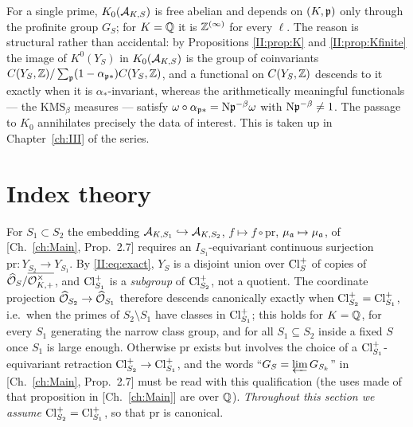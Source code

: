 \begin{remark}\label{II:rem:noarith}
For a single prime, $K_0(\mathcal{A}_{K,S})$ is free abelian and depends on $(K,\mathfrak{p})$ only through
the profinite group $G_S$; for $K=\mathbb{Q}$ it is $\mathbb{Z}^{(\infty)}$ for every $\ell$. The reason
is structural rather than accidental: by Propositions \ref{II:prop:K} and \ref{II:prop:Kfinite}
the image of $K^0(Y_S)$ in $K_0(\mathcal{A}_{K,S})$ is the group of coinvariants
$C(Y_S,\mathbb{Z})/\sum_{\mathfrak{p}}(1-\alpha_{\mathfrak{p}*})C(Y_S,\mathbb{Z})$, and a functional on $C(Y_S,\mathbb{Z})$ descends
to it exactly when it is $\alpha_*$-invariant, whereas the arithmetically meaningful
functionals --- the $\mathrm{KMS}_\beta$ measures --- satisfy
$\omega\circ\alpha_{\mathfrak{p}*}=\mathrm{N}\mathfrak{p}^{-\beta}\omega$ with $\mathrm{N}\mathfrak{p}^{-\beta}\ne1$. The passage to
$K_0$ annihilates precisely the data of interest. This is taken up in Chapter~\ref{ch:III} of the
series.
\end{remark}

\section{Index theory}

\begin{remark}\label{II:rem:embed}
For $S_1\subset S_2$ the embedding $\mathcal{A}_{K,S_1}\hookrightarrow\mathcal{A}_{K,S_2}$, $f\mapsto f\circ\mathrm{pr}$,
$\mu_{\mathfrak{a}}\mapsto\mu_{\mathfrak{a}}$, of [Ch.~\ref{ch:Main}, Prop.~2.7] requires an $I_{S_1}$-equivariant
continuous surjection $\mathrm{pr}:Y_{S_2}\to Y_{S_1}$. By \eqref{II:eq:exact}, $Y_S$ is a
disjoint union over $\operatorname{Cl}^+_S$ of copies of $\widehat{\mathcal{O}}_S/\overline{\mathcal{O}^\times_{K,+}}$, and
$\operatorname{Cl}^+_{S_1}$ is a \emph{subgroup} of $\operatorname{Cl}^+_{S_2}$, not a quotient. The coordinate
projection $\widehat{\mathcal{O}}_{S_2}\to\widehat{\mathcal{O}}_{S_1}$ therefore descends canonically exactly when
$\operatorname{Cl}^+_{S_2}=\operatorname{Cl}^+_{S_1}$, i.e.\ when the primes of $S_2\setminus S_1$ have classes in
$\operatorname{Cl}^+_{S_1}$; this holds for $K=\mathbb{Q}$, for every $S_1$ generating the narrow class group,
and for all $S_1\subseteq S_2$ inside a fixed $S$ once $S_1$ is large enough. Otherwise
$\mathrm{pr}$ exists but involves the choice of a $\operatorname{Cl}^+_{S_1}$-equivariant retraction
$\operatorname{Cl}^+_{S_2}\to\operatorname{Cl}^+_{S_1}$, and the words ``$G_S=\varprojlim G_{S_k}$'' in
[Ch.~\ref{ch:Main}, Prop.~2.7] must be read with this qualification (the uses made of that
proposition in [Ch.~\ref{ch:Main}] are over $\mathbb{Q}$). \emph{Throughout this section we assume
$\operatorname{Cl}^+_{S_2}=\operatorname{Cl}^+_{S_1}$}, so that $\mathrm{pr}$ is canonical.
\end{remark}

